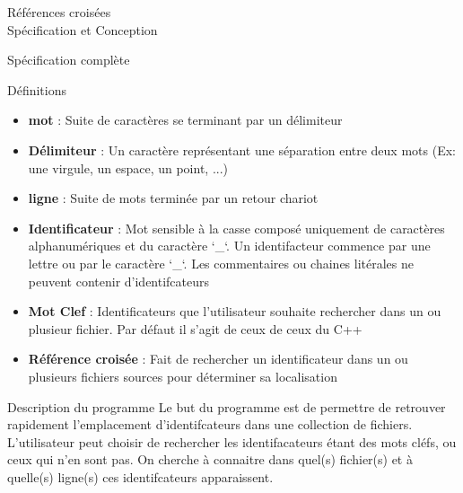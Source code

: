 \documentclass{article}
\begin{document}
\begin{center} 
\Huge{Références croisées \\ Spécification et Conception}
\end{center}



\begin{section}{Spécification complète}


  \begin{subsection}{Définitions}

    \begin{itemize}

      \item \textbf{mot} : Suite de caractères se terminant par un délimiteur

      \item \textbf{Délimiteur} : Un caractère représentant une séparation entre deux mots (Ex: une virgule, un espace, un point, ...) 

      \item \textbf{ligne} : Suite de mots terminée par un retour chariot

      \item \textbf{Identificateur} : Mot sensible à la casse composé uniquement de caractères alphanumériques et du caractère `\_`. 
				      Un identifacteur commence par une lettre ou par le caractère `\_`.
				      Les commentaires ou chaines litérales ne peuvent contenir d'identifcateurs
				     
      \item \textbf{Mot Clef} : Identificateurs que l'utilisateur souhaite rechercher dans un ou plusieur fichier. Par défaut il s'agit de ceux de ceux du C++

      \item \textbf{Référence croisée} : Fait de rechercher un identificateur dans un ou plusieurs fichiers sources pour déterminer sa localisation
    \end{itemize}

  \end{subsection}


  \begin{subsection}{Description du programme}
    Le but du programme est de permettre de retrouver rapidement l'emplacement d'identifcateurs dans une collection de fichiers.
    L'utilisateur peut choisir de rechercher les identifacateurs étant des mots cléfs, ou ceux qui n'en sont pas.
    On cherche à connaitre dans quel(s) fichier(s) et à quelle(s) ligne(s) ces identifcateurs apparaissent.
    

\end{subsection}
\end{section}
\end{document}
